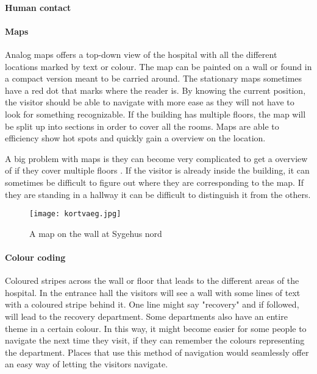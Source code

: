 \paragraph{Human contact}

\paragraph{Maps}
Analog maps\cite{map} offers a top-down view of the hospital with all the different locations marked by text or colour\cite{art_Osborne}. The map can be painted on a wall\cite{wall_map} or found in a compact version meant to be carried around. The stationary maps sometimes have a red dot that marks where the reader is. By knowing the current position, the visitor should be able to navigate with more ease\cite{map_survey} as they will not have to look for something recognizable. If the building has multiple floors, the map will be split up into sections in order to cover all the rooms.
Maps are able to efficiency show hot spots and quickly gain a overview on the location\cite{pros_analog_map}.

A big problem with maps is they can become very complicated to get a overview of if they cover multiple floors \cite{map_confusing}. If the visitor is already inside the building, it can sometimes be difficult to figure out where they are corresponding to the map. If they are standing in a hallway it can be difficult to distinguish it from the others. 

  \begin{figure}[ht!]
  \centering
  \texttt{[image: kortvaeg.jpg]}
  \caption{A map on the wall at Sygehus nord}
  \label{overflow}
  \end{figure}
\paragraph{Colour coding}
Coloured stripes across the wall or floor that leads to the different areas of the hospital. In the entrance hall the visitors will see a wall with some lines of text with a coloured stripe behind it. One line might say "recovery" and if followed, will lead to the recovery department. Some departments also have an entire theme in a certain colour. In this way, it might become easier for some people to navigate the next time they visit, if they can remember the colours representing the department. 
Places that use this method of navigation would seamlessly offer an easy way of letting the visitors navigate.

